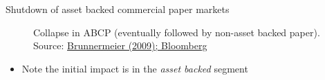 

\begin{frame}{Shutdown of asset backed commercial paper markets}

\begin{figure}
\begin{center}


\caption{\label{fig:L4_ABCP_cliff} Collapse in ABCP (eventually followed by non-asset backed paper). Source: \href{https://www.princeton.edu/~markus/research/papers/liquidity_credit_crunch.pdf}{Brunnermeier (2009); Bloomberg}}

\end{center}
\end{figure}

\begin{itemize}
\item	Note the initial impact is in the \emph{asset backed} segment
\end{itemize}

\end{frame}




